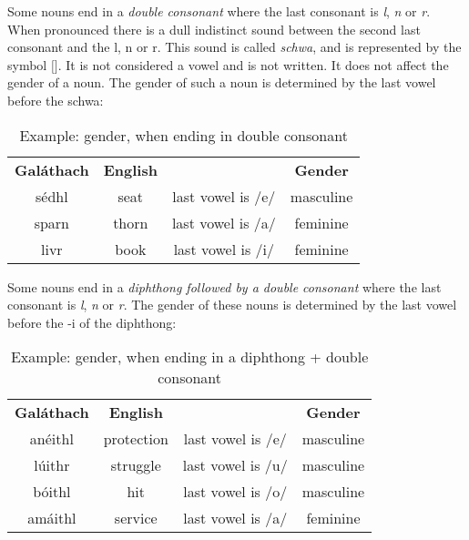 Some nouns end in a \textit{double consonant} where the last consonant is \textit{l}, \textit{n} or \textit{r}. When pronounced there is a dull indistinct sound between the second last consonant and the l, n or r. This sound is called \textit{schwa}, and is represented by the symbol $[$\textschwa$]$. It is not considered a vowel and is not written. It does not affect the gender of a noun. The gender of such a noun is determined by the last vowel before the schwa:
\begin{table}[H]
\centering
\begin{tabular}{cccc}
  \toprule
  \textbf{Gal\'{a}thach} & \textbf{English} & & \textbf{Gender}\\
  \cmidrule(lr){1-1}\cmidrule(lr){2-2}\cmidrule(lr){4-4}
  s\'{e}dhl & seat & last vowel is /e/ & masculine\\
  sparn & thorn & last vowel is /a/ & feminine\\
  livr & book & last vowel is /i/ & feminine\\
  \bottomrule
\end{tabular}
\caption{Example: gender, when ending in double consonant}
\label{example_gender_when_ending_in_double_consonant}
\end{table}

Some nouns end in a \textit{diphthong followed by a double consonant} where the last consonant is \textit{l}, \textit{n} or \textit{r}. The gender of these nouns is determined by the last vowel before the -i of the diphthong:
\begin{table}[H]
\centering
\begin{tabular}{cccc}
  \toprule
  \textbf{Gal\'{a}thach} & \textbf{English} & & \textbf{Gender}\\
  \cmidrule(lr){1-1}\cmidrule(lr){2-2}\cmidrule(lr){4-4}
  an\'{e}ithl & protection & last vowel is /e/ & masculine\\
  l\'{u}ithr & struggle & last vowel is /u/ & masculine\\
  b\'{o}ithl & hit & last vowel is /o/ & masculine\\
  am\'{a}ithl & service & last vowel is /a/ & feminine\\
  \bottomrule
\end{tabular}
\caption{Example: gender, when ending in a diphthong + double consonant}
\label{example_gender_when_ending_in_diphthong_double_consonant}
\end{table}


